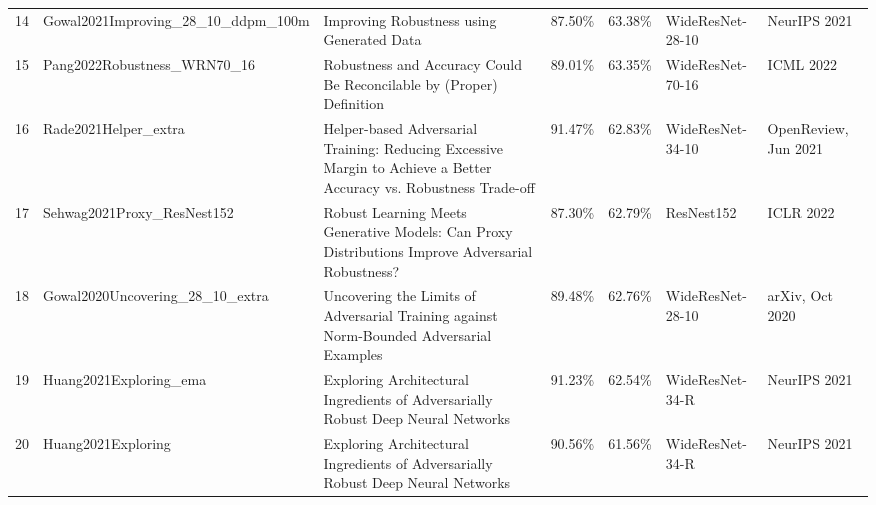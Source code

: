 \begin{table}[]
\begin{tabular}{lllllll}
    14 & Gowal2021Improving\_28\_10\_ddpm\_100m   & Improving Robustness using Generated Data                                                                          & 87.50\%        & 63.38\%         & WideResNet-28-10                                                  & NeurIPS 2021                                               \\
    15 & Pang2022Robustness\_WRN70\_16            & Robustness and Accuracy Could Be Reconcilable by (Proper) Definition                                               & 89.01\%        & 63.35\%         & WideResNet-70-16                                                  & ICML 2022                                                  \\
    16 & Rade2021Helper\_extra                    & Helper-based Adversarial Training: Reducing Excessive Margin to Achieve a Better Accuracy vs. Robustness Trade-off & 91.47\%        & 62.83\%         & WideResNet-34-10                                                  & OpenReview, Jun 2021                                       \\
    17 & Sehwag2021Proxy\_ResNest152              & Robust Learning Meets Generative Models: Can Proxy Distributions Improve Adversarial Robustness?                   & 87.30\%        & 62.79\%         & ResNest152                                                        & ICLR 2022                                                  \\
    18 & Gowal2020Uncovering\_28\_10\_extra       & Uncovering the Limits of Adversarial Training against Norm-Bounded Adversarial Examples                            & 89.48\%        & 62.76\%         & WideResNet-28-10                                                  & arXiv, Oct 2020                                            \\
    19 & Huang2021Exploring\_ema                  & Exploring Architectural Ingredients of Adversarially Robust Deep Neural Networks                                   & 91.23\%        & 62.54\%         & WideResNet-34-R                                                   & NeurIPS 2021                                               \\
    20 & Huang2021Exploring                       & Exploring Architectural Ingredients of Adversarially Robust Deep Neural Networks                                   & 90.56\%        & 61.56\%         & WideResNet-34-R                                                   & NeurIPS 2021                                               \\

\end{tabular}
\end{table}
